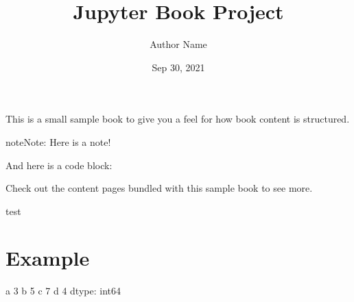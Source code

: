 \documentclass[letterpaper,10pt,english]{jupyterBook}
\title{Jupyter Book Project}
\date{Sep 30, 2021}
\author{Author Name}
\begin{document}
\pagestyle{empty}
\sphinxmaketitle
\pagestyle{plain}
\sphinxtableofcontents
\pagestyle{normal}
\label{\detokenize{content/markdown/intro::doc}}


\sphinxAtStartPar
This is a small sample book to give you a feel for how book content is
structured.

\begin{sphinxadmonition}{note}{Note:}
\sphinxAtStartPar
Here is a note!
\end{sphinxadmonition}

\sphinxAtStartPar
And here is a code block:

\begin{sphinxVerbatim}[commandchars=\\\{\}]
  
\end{sphinxVerbatim}

\sphinxAtStartPar
Check out the content pages bundled with this sample book to see more.

\sphinxAtStartPar
test


\chapter{Example}
\label{\detokenize{content/notebook/example:example}}\label{\detokenize{content/notebook/example::doc}}
\begin{sphinxVerbatim}[commandchars=\\\{\}]
   
\PYG{p}{[}\PYG{p}{]}
\PYG{p}{[}\PYG{p}{]}
\end{sphinxVerbatim}

\begin{sphinxVerbatim}[commandchars=\\\{\}]
a    3
b   \PYGZhy{}5
c    7
d    4
dtype: int64
\end{sphinxVerbatim}
\end{document}
